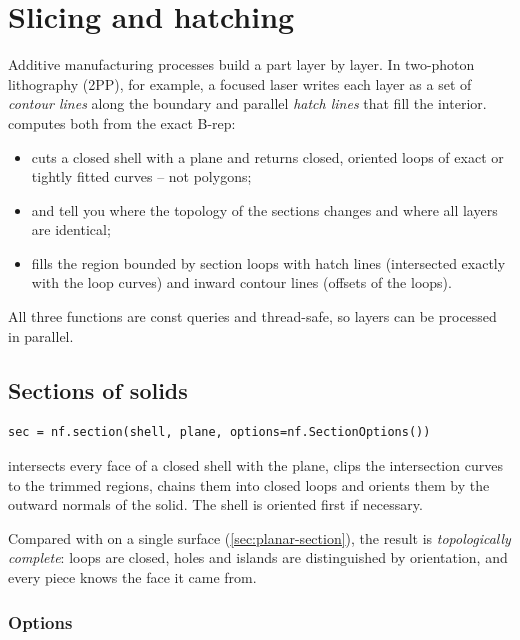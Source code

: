 \chapter{Slicing and hatching}\label{ch:slicing}

Additive manufacturing processes build a part layer by layer. In two-photon lithography (2PP),
for example, a focused laser writes each layer as a set of \emph{contour lines} along the
boundary and parallel \emph{hatch lines} that fill the interior. \NF{} computes both from the
exact B-rep:

\begin{itemize}
\item {} cuts a closed shell with a plane and returns closed, oriented loops of
exact or tightly fitted curves -- not polygons;
\item {} and  tell you where the topology of
the sections changes and where all layers are identical;
\item {} fills the region bounded by section loops with hatch lines (intersected
exactly with the loop curves) and inward contour lines (offsets of the loops).
\end{itemize}

All three functions are const queries and thread-safe, so layers can be processed in
parallel.

\section{Sections of solids}\label{sec:section}

\begin{lstlisting}
sec = nf.section(shell, plane, options=nf.SectionOptions())
\end{lstlisting}

 intersects every face of a closed shell with the plane, clips the
intersection curves to the trimmed regions, chains them into closed loops and orients them
by the outward normals of the solid. The shell is oriented first if necessary.

Compared with  on a single surface (\cref{sec:planar-section}), the
result is \emph{topologically complete}: loops are closed, holes and islands are
distinguished by orientation, and every piece knows the face it came from.

\subsection{Options}

